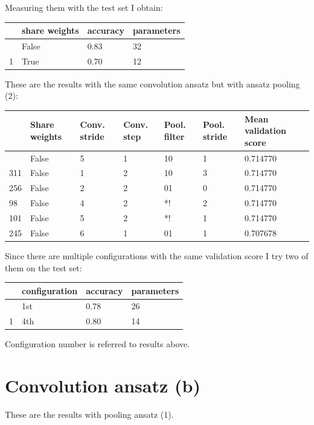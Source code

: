 \documentclass[
  13pt,
  a4paper,
  DIV=11,
  numbers=noendperiod]{scrreprt}
\begin{document}
Measuring them with the test set I obtain:

\begin{longtable}[]{@{}llll@{}}
\toprule\noalign{}
& share weights & accuracy & parameters \\
\midrule\noalign{}
\endhead
\bottomrule\noalign{}
\endlastfoot
0 & False & 0.83 & 32 \\
1 & True & 0.70 & 12 \\
\end{longtable}

These are the results with the same convolution ansatz but with ansatz
pooling (2):

\begin{longtable}[]{@{}lllllll@{}}
\toprule\noalign{}
& Share weights & Conv. stride & Conv. step & Pool. filter & Pool.
stride & Mean validation score \\
\midrule\noalign{}
\endhead
\bottomrule\noalign{}
\endlastfoot
297 & False & 5 & 1 & 10 & 1 & 0.714770 \\
311 & False & 1 & 2 & 10 & 3 & 0.714770 \\
256 & False & 2 & 2 & 01 & 0 & 0.714770 \\
98 & False & 4 & 2 & *! & 2 & 0.714770 \\
101 & False & 5 & 2 & *! & 1 & 0.714770 \\
245 & False & 6 & 1 & 01 & 1 & 0.707678 \\
\end{longtable}

Since there are multiple configurations with the same validation score I
try two of them on the test set:

\begin{longtable}[]{@{}llll@{}}
\toprule\noalign{}
& configuration & accuracy & parameters \\
\midrule\noalign{}
\endhead
\bottomrule\noalign{}
\endlastfoot
0 & 1st & 0.78 & 26 \\
1 & 4th & 0.80 & 14 \\
\end{longtable}

Configuration number is referred to results above.

\section{Convolution ansatz (b)}\label{convolution-ansatz-b}

These are the results with pooling ansatz (1).
\end{document}
